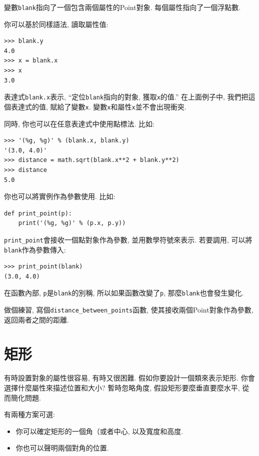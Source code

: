 \documentclass[10pt]{book}
\begin{document}
變數{\tt blank}指向了一個包含兩個屬性的Point對象. 
每個屬性指向了一個浮點數. 

你可以基於同樣語法, 讀取屬性值:

\begin{verbatim}
>>> blank.y
4.0
>>> x = blank.x
>>> x
3.0
\end{verbatim}
%
表達式{\tt blank.x}表示, ``定位{\tt blank}指向的對象, 獲取{\tt x}的值.''
在上面例子中,  我們把這個表達式的值, 賦給了變數{\tt x}. 
變數{\tt x}和屬性{\tt x}並不會出現衝突. 

同時, 你也可以在任意表達式中使用點標法. 比如:

\begin{verbatim}
>>> '(%g, %g)' % (blank.x, blank.y)
'(3.0, 4.0)'
>>> distance = math.sqrt(blank.x**2 + blank.y**2)
>>> distance
5.0
\end{verbatim}
%
你也可以將實例作為參數使用. 比如:

\begin{verbatim}
def print_point(p):
    print('(%g, %g)' % (p.x, p.y))
\end{verbatim}
%
\verb"print_point"會接收一個點對象作為參數, 並用數學符號來表示. 
若要調用, 可以將{\tt blank}作為參數傳入:

\begin{verbatim}
>>> print_point(blank)
(3.0, 4.0)
\end{verbatim}
%
在函數內部, {\tt p}是{\tt blank}的別稱, 所以如果函數改變了{\tt p}, 
那麼{\tt blank}也會發生變化. 

做個練習, 寫個\verb"distance_between_points"函數, 
使其接收兩個Point對象作為參數, 返回兩者之間的距離. 



\section{矩形}
\label{rectangles}

有時設置對象的屬性很容易, 有時又很困難. 
假如你要設計一個類來表示矩形. 你會選擇什麼屬性來描述位置和大小?
暫時忽略角度, 假設矩形要麼垂直要麼水平, 從而簡化問題. 

有兩種方案可選: 

\begin{itemize}

\item 你可以確定矩形的一個角（或者中心, 以及寬度和高度. 

\item 你也可以聲明兩個對角的位置. 

\end{itemize}
\end{document}
